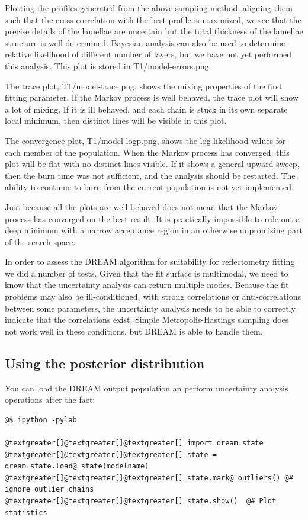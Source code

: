 \documentclass[letterpaper,10pt,english]{sphinxmanual}
\begin{document}
Plotting the profiles generated from the above sampling method, aligning
them such that the cross correlation with the best profile is maximized,
we see that the precise details of the lamellae are uncertain but the
total thickness of the lamellae structure is well determined.  Bayesian
analysis can also be used to determine relative likelihood of different
number of layers, but we have not yet performed this analysis.  This plot
is stored in T1/model-errors.png.

The trace plot, T1/model-trace.png, shows the mixing properties of the
first fitting parameter.  If the Markov process is well behaved, the
trace plot will show a lot of mixing.  If it is ill behaved, and each
chain is stuck in its own separate local minimum, then distinct lines
will be visible in this plot.

The convergence plot, T1/model-logp.png, shows the log likelihood
values for each member of the population.  When the Markov process
has converged, this plot will be flat with no distinct lines visible.
If it shows a general upward sweep, then the burn time was not
sufficient, and the analysis should be restarted.  The ability to
continue to burn from the current population is not yet implemented.

Just because all the plots are well behaved does not mean that the
Markov process has converged on the best result.  It is practically
impossible to rule out a deep minimum with a narrow acceptance
region in an otherwise unpromising part of the search space.

In order to assess the DREAM algorithm for suitability for reflectometry
fitting we did a number of tests.  Given that the fit surface is
multimodal, we need to know that the uncertainty analysis can return
multiple modes.  Because the fit problems may also be ill-conditioned,
with strong correlations or anti-correlations between some parameters,
the uncertainty analysis  needs to be able to correctly indicate that
the correlations exist. Simple Metropolis-Hastings sampling does not
work well in these conditions, but DREAM is able to handle them.


\subsection{Using the posterior distribution}
\label{guide/fitting:using-the-posterior-distribution}
You can load the DREAM output population an perform uncertainty analysis
operations after the fact:

\begin{Verbatim}[commandchars=@\[\]]
@$ ipython -pylab

@textgreater[]@textgreater[]@textgreater[] import dream.state
@textgreater[]@textgreater[]@textgreater[] state = dream.state.load@_state(modelname)
@textgreater[]@textgreater[]@textgreater[] state.mark@_outliers() @# ignore outlier chains
@textgreater[]@textgreater[]@textgreater[] state.show()  @# Plot statistics
\end{Verbatim}
\end{document}
